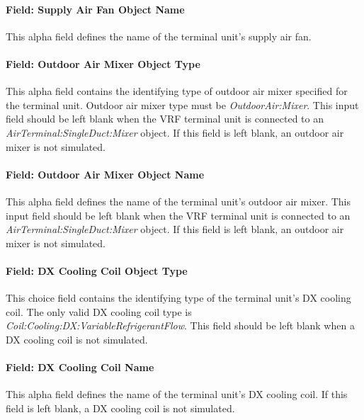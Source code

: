 \paragraph{Field: Supply Air Fan Object Name}\label{field-supply-air-fan-object-name}

This alpha field defines the name of the terminal unit's supply air fan.

\paragraph{Field: Outdoor Air Mixer Object Type}\label{field-outdoor-air-mixer-object-type}

This alpha field contains the identifying type of outdoor air mixer specified for the terminal unit. Outdoor air mixer type must be \textit{OutdoorAir:Mixer}. This input field should be left blank when the VRF terminal unit is connected to an \textit{AirTerminal:SingleDuct:Mixer} object. If this field is left blank, an outdoor air mixer is not simulated.

\paragraph{Field: Outdoor Air Mixer Object Name}\label{field-outdoor-air-mixer-object-name}

This alpha field defines the name of the terminal unit's outdoor air mixer. This input field should be left blank when the VRF terminal unit is connected to an \textit{AirTerminal:SingleDuct:Mixer} object. If this field is left blank, an outdoor air mixer is not simulated.

\paragraph{Field: DX Cooling Coil Object Type}\label{field-dx-cooling-coil-object-type}

This choice field contains the identifying type of the terminal unit's DX cooling coil. The only valid DX cooling coil type is \textit{Coil:Cooling:DX:VariableRefrigerantFlow}. This field should be left blank when a DX cooling coil is not simulated.

\paragraph{Field: DX Cooling Coil Name}\label{field-dx-cooling-coil-name-1}

This alpha field defines the name of the terminal unit's DX cooling coil. If this field is left blank, a DX cooling coil is not simulated.

